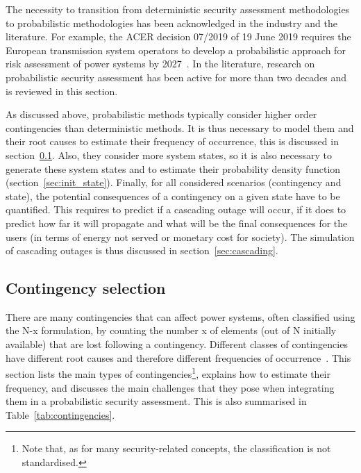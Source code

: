 The necessity to transition from deterministic security assessment methodologies to probabilistic methodologies has been acknowledged in the industry and the literature. For example, the ACER decision 07/2019 of 19 June 2019 requires the European transmission system operators to develop a probabilistic approach for risk assessment of power systems by 2027~\cite{ACER}. In the literature, research on probabilistic security assessment has been active for more than two decades and is reviewed in this section.

As discussed above, probabilistic methods typically consider higher order contingencies than deterministic methods. It is thus necessary to model them and their root causes to estimate their frequency of occurrence, this is discussed in section~\ref{sec:contingencies}. Also, they consider more system states, so it is also necessary to generate these system states and to estimate their probability density function (section~\ref{sec:init_state}). Finally, for all considered scenarios (contingency and state), the potential consequences of a contingency on a given state have to be quantified. This requires to predict if a cascading outage will occur, if it does to predict how far it will propagate and what will be the final consequences for the users (in terms of energy not served or monetary cost for society). The simulation of cascading outages is thus discussed in section~\ref{sec:cascading}.

\subsection{Contingency selection}
\label{sec:contingencies}

There are many contingencies that can affect power systems, often classified using the N-x formulation, \ie by counting the number x of elements (out of N initially available) that are lost following a contingency. Different classes of contingencies have different root causes and therefore different frequencies of occurrence~\cite{ContingencyTypes}. This section lists the main types of contingencies\footnote{Note that, as for many security-related concepts, the classification is not standardised.}, explains how to estimate their frequency, and discusses the main challenges that they pose when integrating them in a probabilistic security assessment. This is also summarised in Table~\ref{tab:contingencies}.


